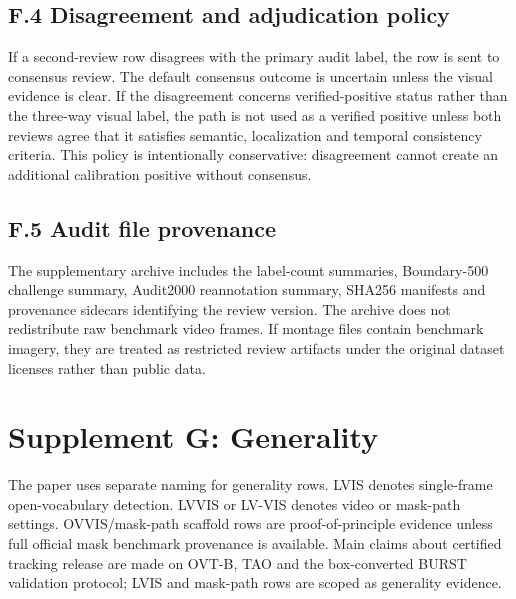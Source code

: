 \documentclass[11pt]{article}
\begin{document}
\subsection*{F.4 Disagreement and adjudication policy}

If a second-review row disagrees with the primary audit label, the row is sent to consensus review.
The default consensus outcome is uncertain unless the visual evidence is clear.
If the disagreement concerns verified-positive status rather than the three-way visual label, the path is not used as a verified positive unless both reviews agree that it satisfies semantic, localization and temporal consistency criteria.
This policy is intentionally conservative: disagreement cannot create an additional calibration positive without consensus.

\subsection*{F.5 Audit file provenance}

The supplementary archive includes the label-count summaries, Boundary-500 challenge summary, Audit2000 reannotation summary, SHA256 manifests and provenance sidecars identifying the review version.
The archive does not redistribute raw benchmark video frames.
If montage files contain benchmark imagery, they are treated as restricted review artifacts under the original dataset licenses rather than public data.

\clearpage

\section*{Supplement G: Generality}

The paper uses separate naming for generality rows.
LVIS denotes single-frame open-vocabulary detection.
LVVIS or LV-VIS denotes video or mask-path settings.
OVVIS/mask-path scaffold rows are proof-of-principle evidence unless full official mask benchmark provenance is available.
Main claims about certified tracking release are made on OVT-B, TAO and the box-converted BURST validation protocol; LVIS and mask-path rows are scoped as generality evidence.
\end{document}
